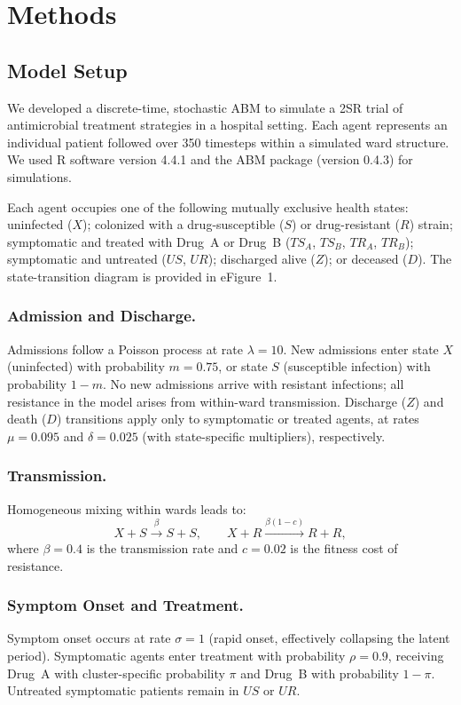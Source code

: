 \documentclass[12pt]{article}
\begin{document}
\section*{Methods}

\subsection*{Model Setup}

We developed a discrete-time, stochastic ABM to simulate a 2SR trial of antimicrobial treatment strategies in a hospital setting. Each agent represents an individual patient followed over 350 timesteps within a simulated ward structure. We used R software version 4.4.1 and the ABM package (version 0.4.3) for simulations.

Each agent occupies one of the following mutually exclusive health states: uninfected ($X$); colonized with a drug-susceptible ($S$) or drug-resistant ($R$) strain; symptomatic and treated with Drug~A or Drug~B ($TS_A$, $TS_B$, $TR_A$, $TR_B$); symptomatic and untreated ($US$, $UR$); discharged alive ($Z$); or deceased ($D$). The state-transition diagram is provided in eFigure~1.

\subsubsection*{Admission and Discharge.}
Admissions follow a Poisson process at rate $\lambda = 10$. New admissions enter state $X$ (uninfected) with probability $m = 0.75$, or state $S$ (susceptible infection) with probability $1 - m$. No new admissions arrive with resistant infections; all resistance in the model arises from within-ward transmission. Discharge ($Z$) and death ($D$) transitions apply only to symptomatic or treated agents, at rates $\mu = 0.095$ and $\delta = 0.025$ (with state-specific multipliers), respectively.

\subsubsection*{Transmission.}
Homogeneous mixing within wards leads to:
\[
  X + S \xrightarrow{\beta} S + S, \qquad
  X + R \xrightarrow{\beta(1 - c)} R + R,
\]
where $\beta = 0.4$ is the transmission rate and $c = 0.02$ is the fitness cost of resistance.

\subsubsection*{Symptom Onset and Treatment.}
Symptom onset occurs at rate $\sigma = 1$ (rapid onset, effectively collapsing the latent period). Symptomatic agents enter treatment with probability $\rho = 0.9$, receiving Drug~A with cluster-specific probability $\pi$ and Drug~B with probability $1 - \pi$. Untreated symptomatic patients remain in $US$ or $UR$.
\end{document}
